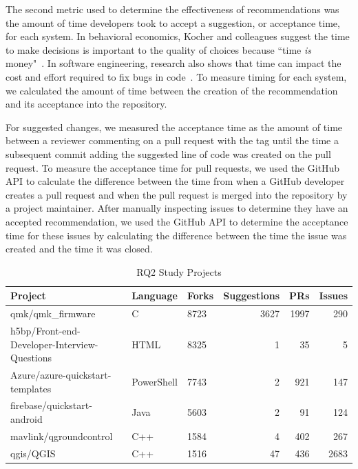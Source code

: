 The second metric used to determine the effectiveness of recommendations was the amount of time developers took to accept a suggestion, or acceptance time, for each system. In behavioral economics, Kocher and colleagues suggest the time to make decisions is important to the quality of choices because ``time \textit{is} money"~\cite{kocher2006time}. In software engineering, research also shows that time can impact the cost and effort required to fix bugs in code~\cite{Williams2007FaultFixTime}. To measure timing for each system, we calculated the amount of time between the creation of the recommendation and its acceptance into the repository.

For suggested changes, we measured the acceptance time as the amount of time between a reviewer commenting on a pull request with the \sugg tag until the time a subsequent commit adding the suggested line of code was created on the pull request. To measure the acceptance time for pull requests, we used the GitHub API to calculate the difference between the time from when a GitHub developer creates a pull request and when the pull request is merged into the repository by a project maintainer. After manually inspecting issues to determine they have an accepted recommendation, we used the GitHub API to determine the acceptance time for these issues by calculating the difference between the time the issue was created and the time it was closed.

\begin{table}[tbh]
\centering
\begin{tabular}{ lllrrr } \hline
  \textbf{Project} & \textbf{Language} & \textbf{Forks} & \textbf{Suggestions} & \textbf{PRs} & \textbf{Issues} \\ \hline
 qmk/qmk\_firmware & C & 8723 & 3627 & 1997 & 290 \\
 h5bp/Front-end-Developer-Interview-Questions & HTML & 8325 & 1 & 35 & 5  \\
 Azure/azure-quickstart-templates & PowerShell & 7743 & 2 & 921 & 147 \\
 firebase/quickstart-android & Java & 5603 & 2 & 91 & 124 \\ 
 mavlink/qgroundcontrol & C++ & 1584 & 4 & 402 & 267 \\
 qgis/QGIS & C++ & 1516 & 47 & 436 & 2683 \\

\end{tabular}
\caption{RQ2 Study Projects}
\label{tab:projects}
\end{table}

